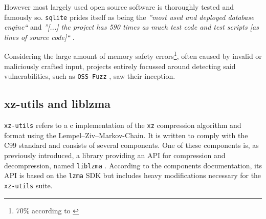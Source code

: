 However most largely used open source software is thoroughly tested and
famously so. \texttt{sqlite} prides itself as being the \textit{''most used and
deployed database engine``} \cite{sqlite2022mostdeployed} and \textit{''[...]
the project has 590 times as much test code and test scripts [as lines of
source code]``} \cite{sqlite2022testing}. 

Considering the large amount of memory safety errors\footnote{70\% according to
\cite{googleUnknownMemorySafety}}, often caused by invalid or maliciously
crafted input, projects entirely focussed around detecting said
vulnerabilities, such as \texttt{OSS-Fuzz} \cite{google2024fuzzing}, saw their
inception.

\subsection{xz-utils and liblzma}

\texttt{xz-utils} refers to a c implementation of the \texttt{xz} compression
algorithm and format using the Lempel–Ziv–Markov-Chain. It is written to comply
with the C99 standard and consists of several components. One of these
components is, as previously introduced, a library providing an API for
compression and decompression, named \texttt{liblzma} \cite{tukaani2024xz}.
According to the components documentation, its API is based on the
\texttt{lzma} SDK but includes heavy modifications necessary for the
\texttt{xz-utils} suite. \cite{ccc2024backdoor}
